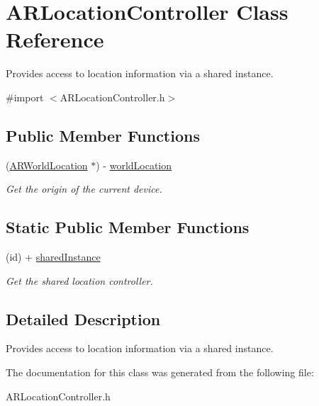 \hypertarget{interface_a_r_location_controller}{
\section{ARLocationController Class Reference}
\label{interface_a_r_location_controller}
}


Provides access to location information via a shared instance.  




{\ttfamily \#import $<$ARLocationController.h$>$}

\subsection*{Public Member Functions}
\begin{DoxyCompactItemize}
\item 
\hypertarget{interface_a_r_location_controller_add343901133f310b9a56d66f89cf5a6a}{
(\hyperlink{interface_a_r_world_location}{ARWorldLocation} $\ast$) -\/ \hyperlink{interface_a_r_location_controller_add343901133f310b9a56d66f89cf5a6a}{worldLocation}}
\label{interface_a_r_location_controller_add343901133f310b9a56d66f89cf5a6a}

\begin{DoxyCompactList}\small\item\em Get the origin of the current device. \end{DoxyCompactList}\end{DoxyCompactItemize}
\subsection*{Static Public Member Functions}
\begin{DoxyCompactItemize}
\item 
\hypertarget{interface_a_r_location_controller_a7667cf3d4be0d3aa33942ace003f54ae}{
(id) + \hyperlink{interface_a_r_location_controller_a7667cf3d4be0d3aa33942ace003f54ae}{sharedInstance}}
\label{interface_a_r_location_controller_a7667cf3d4be0d3aa33942ace003f54ae}

\begin{DoxyCompactList}\small\item\em Get the shared location controller. \end{DoxyCompactList}\end{DoxyCompactItemize}


\subsection{Detailed Description}
Provides access to location information via a shared instance. 

The documentation for this class was generated from the following file:\begin{DoxyCompactItemize}
\item 
ARLocationController.h\end{DoxyCompactItemize}
